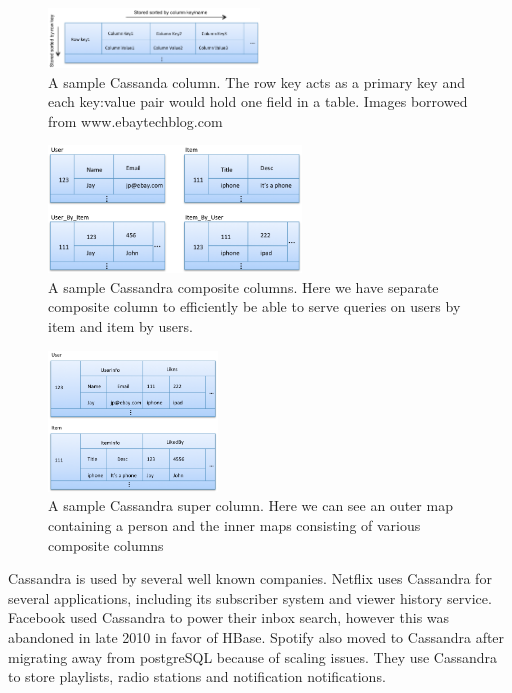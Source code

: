 \begin{figure}[h]
    \centering
    \includegraphics[width=0.5\textwidth]{resources/cas_col.png}
    \caption{A sample Cassanda column. The row key acts as a primary key and each key:value pair would hold one field in a table. Images borrowed from www.ebaytechblog.com}
    \label{fig:sample_col}
\end{figure}

\begin{figure}[h]
    \centering
    \includegraphics[width=0.6\textwidth]{resources/cas_comp_col.png}
    \caption{A sample Cassandra composite columns. Here we have separate composite column to efficiently be able to serve queries on users by item and item by users.}
    \label{fig:sample_comp_col}
\end{figure}

\begin{figure}[ht]
	\centering
	\includegraphics[width=0.4\textwidth]{resources/cas_super_col.png}
	\caption{A sample Cassandra super column. Here we can see an outer map containing a person and the inner maps consisting of various composite columns}
	\label{fig:sample_super_col}
\end{figure}

Cassandra is used by several well known companies. Netflix uses Cassandra for several applications, including its subscriber system and viewer history service. Facebook used Cassandra to power their inbox search, however this was abandoned in late 2010 in favor of HBase. Spotify also moved to Cassandra after migrating away from postgreSQL because of scaling issues. They use Cassandra to store playlists, radio stations and notification notifications.


